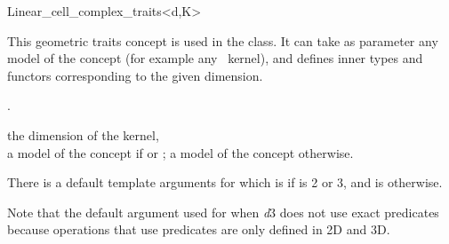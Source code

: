 \ccRefPageBegin

\begin{ccRefClass}{Linear_cell_complex_traits<d,K>}


\ccDefinition

This geometric traits concept is used in the
 class.  It can take as parameter any model of the
concept  (for example any \cgal\ kernel), and defines inner
types and functors corresponding to the given dimension.

\ccIsModel
{}

\ccInheritsFrom
{}.

\ccParameters
{} the dimension of the kernel,\\
 a model of the concept  if  or 
 ; a model of the concept  otherwise. 

There is a default template arguments for  which is
if  is 2 or 3, and is 
otherwise.

Note that the default argument used for  when
\emph{d}\mygt{}3 does not use exact predicates because operations that
use predicates are only defined in 2D and 3D.

\ccConstants
{}

\ccSeeAlso


\end{ccRefClass}
\ccRefPageEnd
